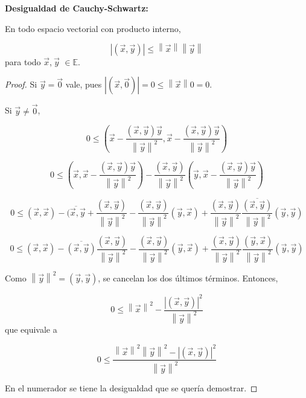 \begin{theorem}\textbf{Desigualdad de Cauchy-Schwartz:}
\label{PROPOSICIÓN 6.39:}



En todo espacio vectorial con producto interno, 

$$\left|{(\vec{x},\vec{y})}\right|\leq {\left\|\vec{x}\right\|\left\|\vec{y}\right\|}$$
\noindent
para todo  $\vec{x}$,$~\vec{y}$  $\in \mathbb{E}$.

\bigskip

\begin{proof}

Si $\vec{y}=\vec{0}$ vale, pues $\left|{(\vec{x},\vec{0})}\right|=0 \leq \left\|\vec{x}\right
\|0=0$.

\bigskip

Si $\vec{y}\neq \vec{0}$,

\bigskip

\[0 \leq (\vec{x}-\frac {(\vec{x},\vec{y})\vec{y}} {\left\|\vec{y}\right\|^2},\vec{x}-\frac {(\vec{x},\vec{y})\vec{y}} {\left\|\vec{y}\right\|^2})
\]
\bigskip

\[
0 \leq (\vec{x},\vec{x}-\frac {(\vec{x},\vec{y})\vec{y}} {\left\|\vec{y}\right\|^2})-\frac {(\vec{x},\vec{y})} {\left\|\vec{y}\right\|^2} (\vec{y},\vec{x}-\frac {(\vec{x},\vec{y})\vec{y}} {\left\|\vec{y}\right\|^2})
\]

\bigskip

\[0 \leq (\vec{x},\vec{x})- \overline{(\vec{x},\vec{y}}+\frac {(\vec{x},\vec{y})} {\left\|\vec{y}\right\|^2}  - \frac {(\vec{x},\vec{y})} {\left\|\vec{y}\right\|^2}(\vec{y},\vec{x}) + \frac {(\vec{x},\vec{y})} {\left\|\vec{y}\right\|^2}\frac {\overline{(\vec{x},\vec{y})}} {\left\|\vec{y}\right\|^2}(\vec{y},\vec{y})
\]

\bigskip


\[0 \leq (\vec{x},\vec{x})- \overline{(\vec{x},\vec{y})}\frac {(\vec{x},\vec{y})} {\left\|\vec{y}\right\|^2}  - \frac {(\vec{x},\vec{y})} {\left\|\vec{y}\right\|^2}(\vec{y},\vec{x}) + \frac {(\vec{x},\vec{y})} {\left\|\vec{y}\right\|^2}\frac {{(\vec{y},\vec{x})}} {\left\|\vec{y}\right\|^2}(\vec{y},\vec{y})
\]

\bigskip


Como $\left\|\vec{y}\right\|^2=(\vec{y},\vec{y})$, se cancelan los dos últimos términos. Entonces,

\bigskip

\[0 \leq \left\|\vec{x}\right\|^2 - \frac {\left|{(\vec{x},\vec{y})}\right|^2} {\left\|\vec{y}\right\|^2}
\]
\noindent
que equivale a 

\[0 \leq  \frac {\left\|\vec{x}\right\|^2 \left\|\vec{y}\right\|^2 -\left|{(\vec{x},\vec{y})}\right|^2} {\left\|\vec{y}\right\|^2}
\]
\bigskip

En el numerador se tiene la desigualdad que se quería demostrar.

\end{proof}
\end{theorem}







